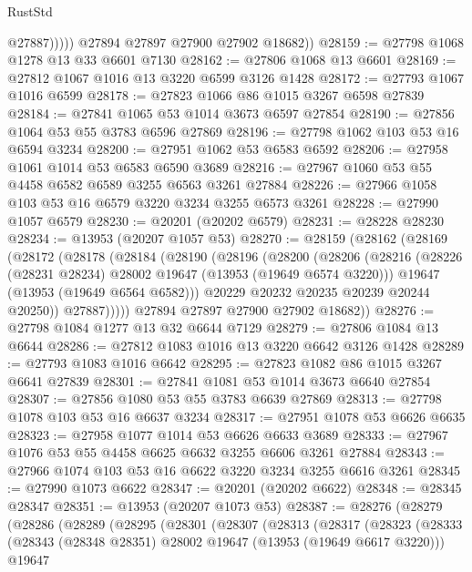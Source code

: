 \begin{lexlean}{RustStd}
\begin{coremodule}
                  @27887)))))
        @27894
        @27897
        @27900
        @27902
        @18682))
@28159 := @27798 @1068 @1278 @13 @33 @6601 @7130
@28162 := @27806 @1068 @13 @6601
@28169 := @27812 @1067 @1016 @13 @3220 @6599 @3126 @1428
@28172 := @27793 @1067 @1016 @6599
@28178 := @27823 @1066 @86 @1015 @3267 @6598 @27839
@28184 := @27841 @1065 @53 @1014 @3673 @6597 @27854
@28190 := @27856 @1064 @53 @55 @3783 @6596 @27869
@28196 := @27798 @1062 @103 @53 @16 @6594 @3234
@28200 := @27951 @1062 @53 @6583 @6592
@28206 := @27958 @1061 @1014 @53 @6583 @6590 @3689
@28216 := @27967 @1060 @53 @55 @4458 @6582 @6589 @3255 @6563 @3261 @27884
@28226 := @27966 @1058 @103 @53 @16 @6579 @3220 @3234 @3255 @6573 @3261
@28228 := @27990 @1057 @6579
@28230 := @20201 (@20202 @6579)
@28231 := @28228 @28230
@28234 := @13953 (@20207 @1057 @53)
@28270 := @28159
    (@28162
      (@28169
        (@28172
          (@28178
            (@28184
              (@28190
                (@28196
                  (@28200
                    (@28206
                      (@28216
                        (@28226 (@28231 @28234) @28002 @19647 (@13953 (@19649 @6574 @3220)))
                        @19647
                        (@13953 (@19649 @6564 @6582)))
                      @20229
                      @20232
                      @20235
                      @20239
                      @20244
                      @20250))
                  @27887)))))
        @27894
        @27897
        @27900
        @27902
        @18682))
@28276 := @27798 @1084 @1277 @13 @32 @6644 @7129
@28279 := @27806 @1084 @13 @6644
@28286 := @27812 @1083 @1016 @13 @3220 @6642 @3126 @1428
@28289 := @27793 @1083 @1016 @6642
@28295 := @27823 @1082 @86 @1015 @3267 @6641 @27839
@28301 := @27841 @1081 @53 @1014 @3673 @6640 @27854
@28307 := @27856 @1080 @53 @55 @3783 @6639 @27869
@28313 := @27798 @1078 @103 @53 @16 @6637 @3234
@28317 := @27951 @1078 @53 @6626 @6635
@28323 := @27958 @1077 @1014 @53 @6626 @6633 @3689
@28333 := @27967 @1076 @53 @55 @4458 @6625 @6632 @3255 @6606 @3261 @27884
@28343 := @27966 @1074 @103 @53 @16 @6622 @3220 @3234 @3255 @6616 @3261
@28345 := @27990 @1073 @6622
@28347 := @20201 (@20202 @6622)
@28348 := @28345 @28347
@28351 := @13953 (@20207 @1073 @53)
@28387 := @28276
    (@28279
      (@28286
        (@28289
          (@28295
            (@28301
              (@28307
                (@28313
                  (@28317
                    (@28323
                      (@28333
                        (@28343 (@28348 @28351) @28002 @19647 (@13953 (@19649 @6617 @3220)))
                        @19647

\end{coremodule}
\end{lexlean}
